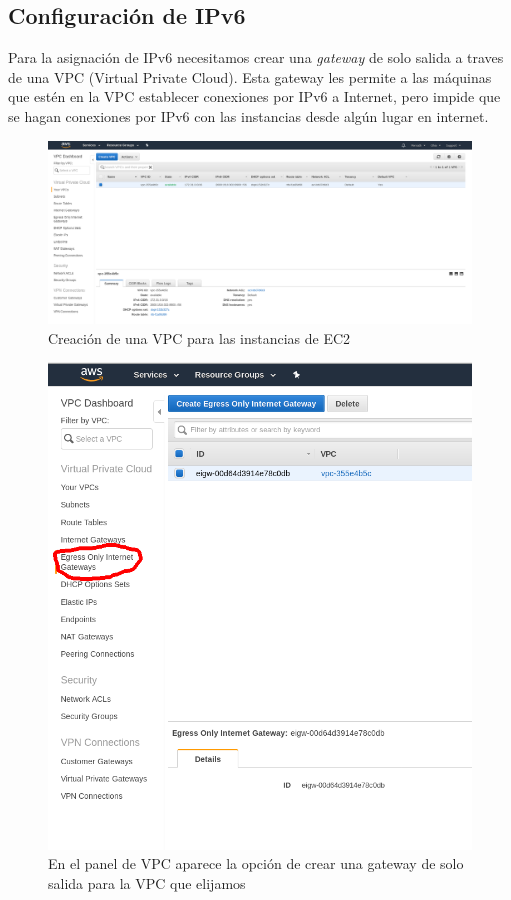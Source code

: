 \documentclass[9pt]{article}
\begin{document}
\subsection{Configuración de IPv6}
Para la asignación de IPv6 necesitamos crear una \textit{gateway} de solo salida a traves de una \textsf{VPC} (Virtual Private Cloud). Esta gateway les permite a las máquinas que estén en la VPC establecer conexiones por IPv6 a Internet, pero impide que se hagan conexiones por IPv6 con las instancias desde algún lugar en internet.
\\
\begin{figure}[H]
  \centering
  \includegraphics[width=0.8\linewidth]{vpc}
  \caption{Creación de una VPC para las instancias de EC2}
\end{figure}
\begin{figure}
  \centering
  \includegraphics[width=0.8\linewidth]{vpc_egress_onlyv2}
  \caption{En el panel de VPC aparece la opción de crear una gateway de solo salida para la VPC que elijamos}
\end{figure}
\end{document}
